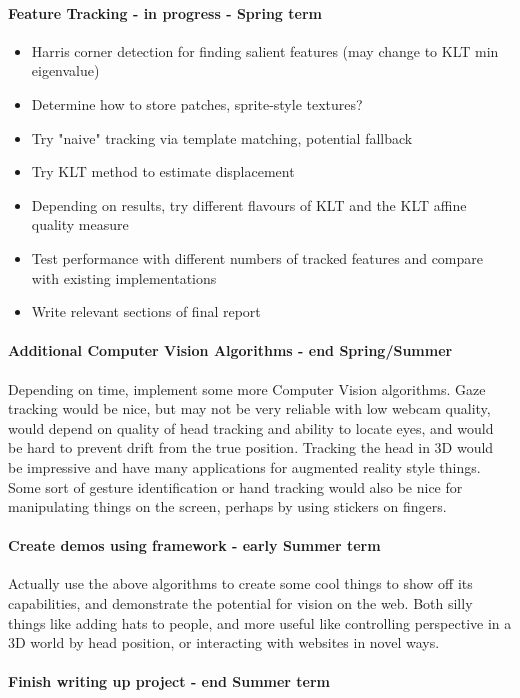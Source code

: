 \documentclass[a4paper]{article}
\begin{document}
\paragraph{Feature Tracking - in progress - Spring term}
\begin{itemize}
\item Harris corner detection for finding salient features (may change to KLT min eigenvalue)
\item Determine how to store patches, sprite-style textures?
\item Try "naive" tracking via template matching, potential fallback
\item Try KLT method to estimate displacement
\item Depending on results, try different flavours of KLT and the KLT affine quality measure
\item Test performance with different numbers of tracked features and compare with existing implementations
\item Write relevant sections of final report
\end{itemize}

\paragraph{Additional Computer Vision Algorithms - end Spring/Summer}
Depending on time, implement some more Computer Vision algorithms. Gaze tracking would be nice, but may not be very reliable with low webcam quality, would depend on quality of head tracking and ability to locate eyes, and would be hard to prevent drift from the true position. Tracking the head in 3D would be impressive and have many applications for augmented reality style things. Some sort of gesture identification or hand tracking would also be nice for manipulating things on the screen, perhaps by using stickers on fingers.

\paragraph{Create demos using framework - early Summer term}
Actually use the above algorithms to create some cool things to show off its capabilities, and demonstrate the potential for vision on the web. Both silly things like adding hats to people, and more useful like controlling perspective in a 3D world by head position, or interacting with websites in novel ways.

\paragraph{Finish writing up project - end Summer term}
\end{document}
